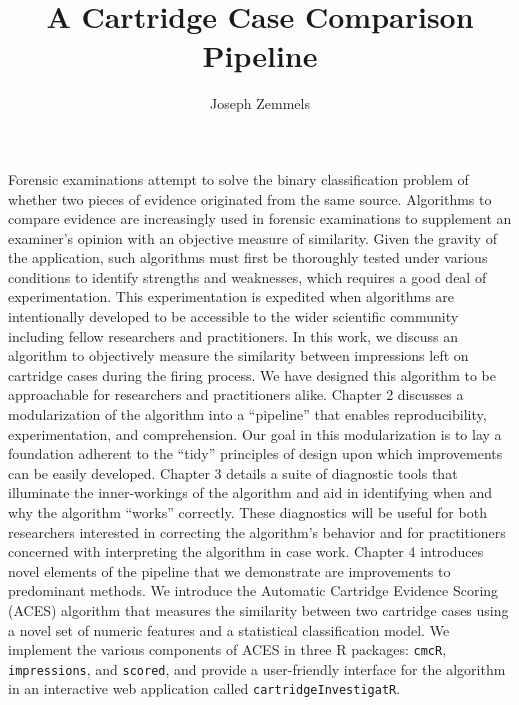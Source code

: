 \documentclass[11pt,]{isuthesis}
\title{A Cartridge Case Comparison Pipeline}
\author{Joseph Zemmels}
\date{}
\begin{document}
\maketitle


\cleardoublepage {}


{
\hypersetup{linkcolor=black}
\vspace{-2cm}
\setcounter{tocdepth}{2}
\tableofcontents
}

\cleardoublepage {} {}
\listoftables
\cleardoublepage {} {}
\listoffigures


\cleardoublepage {}



Forensic examinations attempt to solve the binary classification problem of whether two pieces of evidence originated from the same source. Algorithms to compare evidence are increasingly used in forensic examinations to supplement an examiner's opinion with an objective measure of similarity. Given the gravity of the application, such algorithms must first be thoroughly tested under various conditions to identify strengths and weaknesses, which requires a good deal of experimentation. This experimentation is expedited when algorithms are intentionally developed to be accessible to the wider scientific community including fellow researchers and practitioners. In this work, we discuss an algorithm to objectively measure the similarity between impressions left on cartridge cases during the firing process. We have designed this algorithm to be approachable for researchers and practitioners alike. Chapter 2 discusses a modularization of the algorithm into a ``pipeline'' that enables reproducibility, experimentation, and comprehension. Our goal in this modularization is to lay a foundation adherent to the ``tidy'' principles of design upon which improvements can be easily developed. Chapter 3 details a suite of diagnostic tools that illuminate the inner-workings of the algorithm and aid in identifying when and why the algorithm ``works'' correctly. These diagnostics will be useful for both researchers interested in correcting the algorithm's behavior and for practitioners concerned with interpreting the algorithm in case work. Chapter 4 introduces novel elements of the pipeline that we demonstrate are improvements to predominant methods. We introduce the Automatic Cartridge Evidence Scoring (ACES) algorithm that measures the similarity between two cartridge cases using a novel set of numeric features and a statistical classification model. We implement the various components of ACES in three R packages: \texttt{cmcR}, \texttt{impressions}, and \texttt{scored}, and provide a user-friendly interface for the algorithm in an interactive web application called \texttt{cartridgeInvestigatR}.
\end{document}
